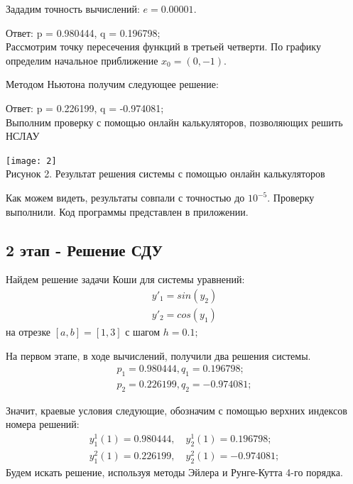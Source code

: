 \documentclass[a4paper,12pt]{article}
\begin{document}
 Зададим точность вычислений: $e  = 0.00001 $.
 
 Ответ: p = 0.980444, q = 0.196798;\\
 
 Рассмотрим точку пересечения функций в третьей четверти. По графику определим начальное приближение $ x_{0}=(0,-1) $.
 
 Методом Ньютона получим следующее решение:
 
 Ответ: p = 0.226199, q = -0.974081;\\
 
 Выполним проверку с помощью онлайн калькуляторов, позволяющих решить НСЛАУ
\begin{center}
	 \texttt{[image: 2]}\\
	 \color{blue}
	 Рисунок 2. Результат решения системы с помощью онлайн калькуляторов
\end{center}
Как можем видеть, результаты совпали с точностью до $ 10^{-5} $. Проверку выполнили. Код программы представлен в приложении.
\clearpage
\subsection{2 этап - Решение СДУ}
Найдем решение задачи Коши для системы уравнений:
$$
\begin{array}{c}
	y'_{1}=sin(y_{2})\\
	y'_{2}=cos(y_{1})	
\end{array}
$$
на отрезке $ [a,b]=[1,3] $ с шагом $ h=0.1;\;\;$

На первом этапе, в ходе вычислений, получили два решения системы.
$$
\begin{array}{c}
	p_{1} = 0.980444, q_{1} = 0.196798;\\
	p_{2} = 0.226199, q_{2} = -0.974081;
\end{array}
$$

Значит, краевые условия следующие, обозначим с помощью верхних индексов номера решений:
$$
\begin{array}{c}
	y^{1}_{1}(1) = 0.980444,\quad y^{1}_{2}(1) = 0.196798;\\
	y^{2}_{1}(1)  = 0.226199, \quad y^{2}_{2}(1) = -0.974081;
\end{array}
$$  
Будем искать решение, используя методы Эйлера и Рунге-Кутта 4-го порядка.
\end{document}
